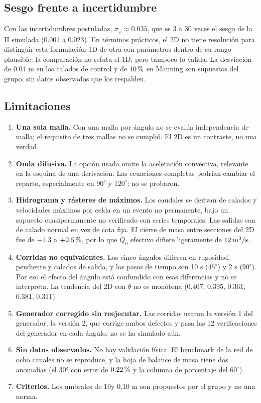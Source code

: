 \subsection{Sesgo frente a incertidumbre}
Con las incertidumbres postuladas, $\sigma_\varphi\approx0.035$, que es 3 a 30 veces el sesgo de la II simulada (0.001 a 0.023). En términos prácticos, el 2D no tiene resolución para distinguir esta formulación 1D de otra con parámetros dentro de su rango plausible: la comparación no refuta el 1D, pero tampoco lo valida. La desviación de 0.04 m en los calados de control y de $10\text{\thinspace\%}$ en Manning son supuestos del grupo, sin datos observados que los respalden.

\subsection{Limitaciones}
\begin{enumerate}[label=\arabic*)]
\item \textbf{Una sola malla.} Con una malla por ángulo no se evalúa independencia de malla; el requisito de tres mallas no se cumplió. El 2D es un contraste, no una verdad.
\item \textbf{Onda difusiva.} La opción usada omite la aceleración convectiva, relevante en la esquina de una derivación. Las ecuaciones completas podrían cambiar el reparto, especialmente en $90^\circ$ y $120^\circ$; no se probaron.
\item \textbf{Hidrograma y rásteres de máximos.} Los caudales se derivan de calados y velocidades máximos por celda en un evento no permanente, bajo un supuesto cuasipermanente no verificado con series temporales. Las salidas son de calado normal en vez de cota fija. El cierre de masa entre secciones del 2D fue de $-1.3$ a $+2.5\text{\thinspace\%}$, por lo que $Q_0$ efectivo difiere ligeramente de $12\,\mathrm{m^3/s}$.
\item \textbf{Corridas no equivalentes.} Los cinco ángulos difieren en rugosidad, pendiente y calados de salida, y los pasos de tiempo son 10 s ($45^\circ$) y 2 s ($90^\circ$). Por eso el efecto del ángulo está confundido con esas diferencias y no se interpreta. La tendencia del 2D con $\theta$ no es monótona (0.407, 0.395, 0.361, 0.381, 0.311).
\item \textbf{Generador corregido sin reejecutar.} Las corridas usaron la versión 1 del generador; la versión 2, que corrige ambos defectos y pasa las 12 verificaciones del generador en cada ángulo, no se ha simulado aún.
\item \textbf{Sin datos observados.} No hay validación física. El benchmark de la red de ocho canales no se reproduce, y la hoja de balance de masa tiene dos anomalías (el 30° con error de $0.22\text{\thinspace\%}$ y la columna de porcentaje del $60^\circ$).
\item \textbf{Criterios.} Los umbrales de 10\pc y 0.10 m son propuestos por el grupo y no una norma.
\end{enumerate}
